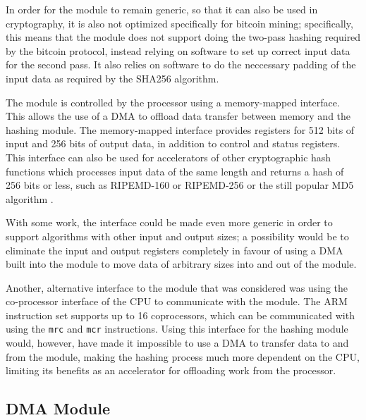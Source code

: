 In order for the module to remain generic, so that it can also be used in cryptography, it
is also not optimized specifically for bitcoin mining; specifically, this means that the module
does not support doing the two-pass hashing required by the bitcoin protocol, instead relying
on software to set up correct input data for the second pass. It also relies on software to
do the neccessary padding of the input data as required by the SHA256 algorithm.

The module is controlled by the processor using a memory-mapped interface. This allows the use
of a DMA to offload data transfer between memory and the hashing module. The memory-mapped interface
provides registers for 512 bits of input and 256 bits of output data, in addition to control and
status registers. This interface can also be used for accelerators of other cryptographic hash
functions which processes input data of the same length and returns a hash of 256 bits or less,
such as RIPEMD-160 or RIPEMD-256 \cite{ripemd} or the still popular MD5 algorithm \cite{md5}.

With some work, the interface could be made even more generic in order to support algorithms
with other input and output sizes; a possibility would be to eliminate the input and output
registers completely in favour of using a DMA built into the module to move data of arbitrary
sizes into and out of the module.

Another, alternative interface to the module that was considered was using the co-processor interface
of the CPU to communicate with the module. The ARM instruction set supports up to 16 coprocessors,
which can be communicated with using the \texttt{mrc} and \texttt{mcr} instructions. Using this
interface for the hashing module would, however, have made it impossible to use a DMA to transfer
data to and from the module, making the hashing process much more dependent on the CPU, limiting
its benefits as an accelerator for offloading work from the processor.

\subsection{DMA Module}

